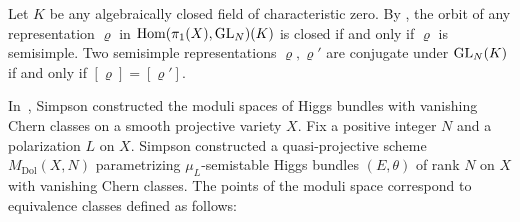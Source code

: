 \documentclass[english]{amsproc}
\theoremstyle{plain}
\theoremstyle{definition}
\theoremstyle{remark}
\theoremstyle{plain}
\numberwithin{equation}{thm} %
\newcommand{\Hom}{{\rm Hom}}
\newcommand{\GL}{{\rm GL}}
\begin{document}
Let $K$ be any algebraically closed field of characteristic zero.  
By \cite[Theorem 30]{Sik12}, the orbit of  any representation $\varrho$ in $ \Hom(\pi_1(X), \GL_N)(K)$ is closed if and only if  $\varrho$ is   semisimple. Two semisimple representations $\varrho,\varrho'$ are conjugate under $\GL_N(K)$ if and only if $[\varrho]=[\varrho']$. 




In~\cite{Sim94,Sim94b}, Simpson constructed the moduli spaces of Higgs bundles with vanishing Chern classes on a smooth projective variety $X$. Fix a positive integer $N$ and a polarization $L$ on $X$. Simpson constructed a quasi-projective scheme $M_{\mathrm{Dol}}(X,N)$ parametrizing   $\mu_L$-semistable Higgs bundles $(E,\theta)$ of rank $N$ on $X$ with vanishing Chern classes. The points of the moduli space correspond to equivalence classes defined as follows:
\end{document}
